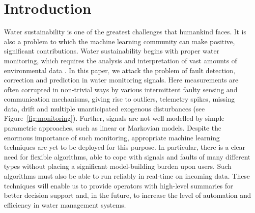 \documentclass{article} %
\begin{document}
\section{Introduction}

Water sustainability is one of the greatest challenges that humankind
faces. It is also a problem to which the machine learning community
can make positive, significant contributions. Water sustainability
begins with proper water monitoring, which requires the analysis and
interpretation of vast amounts of environmental data
\citep{wagner2006guidelines}. In this paper, we attack the problem of fault detection, correction
and prediction in water monitoring signals.
Here measurements are often corrupted in non-trivial ways by various
intermittent faulty sensing and communication mechanisms, giving rise
to outliers, telemetry spikes, missing data, drift and multiple
unanticipated exogenous disturbances (see Figure~\ref{fig:monitoring}).
Further, signals are not well-modelled by simple parametric
approaches, such as linear or Markovian models. Despite the enormous
importance of
such monitoring, appropriate machine learning techniques are yet to be
deployed for this purpose. In particular, there is a clear need for
flexible algorithms, able to cope with signals and faults of many
different types without placing a significant model-building burden
upon users. Such algorithms must also be able to run reliably in
real-time on incoming data. 
These techniques will enable us to provide operators with high-level
summaries for better decision support and, in the future, to increase
the level of automation and efficiency in water management systems.
\end{document}
